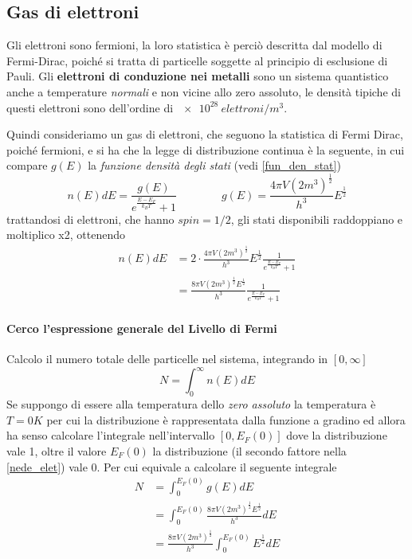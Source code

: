\subsection{Gas di elettroni}

Gli elettroni sono fermioni, la loro statistica è perciò descritta dal modello di Fermi-Dirac, poiché si tratta di particelle soggette al principio di esclusione di Pauli.
Gli \textbf{elettroni di conduzione nei metalli} sono un sistema quantistico anche a temperature \textit{normali} e non vicine allo zero assoluto, le densità tipiche di questi elettroni sono dell'ordine di $\SI{e28}{elettroni/m^3}$.

Quindi consideriamo un gas di elettroni, che seguono la statistica di Fermi Dirac, poiché fermioni, e si ha che la legge di distribuzione continua è la seguente, in cui compare $g(E)$ la \textit{funzione densità degli stati} (vedi \ref{fun_den_stat})
\begin{equation}
n(E)dE = \frac{ g(E)}{e^{ \frac{ E - E_F}{k_B T } } + 1 }
\quad\quad\quad\quad
g(E) = \frac{4 \pi V (2m^3)^{ \frac{1}{2} }}{h^3} E^{ \frac{1}{2} }
\end{equation}
trattandosi di elettroni, che hanno $spin=1/2$, gli stati disponibili raddoppiano e moltiplico x2, ottenendo
\begin{equation}
\begin{split}
n(E)dE & = 2 \cdot \frac{4 \pi V (2m^3)^{\frac{1}{2}} }{h^3} E^{\frac{1}{2}} \frac{1}{e^{\frac{E - E_F}{k_B T}} + 1} \\
& = \frac{8 \pi V (2m^3)^{\frac{1}{2}} E^{\frac{1}{2}}}{h^3} \frac{1}{e^{\frac{E - E_F}{k_B T}} + 1}
\label{nede_elet}
\end{split}
\end{equation}

\paragraph{Cerco l'espressione generale del Livello di Fermi}
Calcolo il numero totale delle particelle nel sistema, integrando in $[0, \infty]$
\begin{equation}
N = \int_0^{\infty} n(E)dE
\end{equation}
Se suppongo di essere alla temperatura dello \textit{zero assoluto} la temperatura è $T=0 K$ per cui la distribuzione è rappresentata dalla funzione a gradino ed allora ha senso calcolare l'integrale nell'intervallo $[0, E_F(0)]$ dove la distribuzione vale 1, oltre il valore $E_F(0)$ la distribuzione (il secondo fattore nella \ref{nede_elet}) vale 0.
Per cui equivale a calcolare il seguente integrale
\begin{equation}
\begin{split}
N & = \int_0^{E_F(0)} g(E)dE \\
& = \int_0^{E_F(0)} \frac{8 \pi V (2m^3)^{\frac{1}{2}} E^{\frac{1}{2}}}{h^3} dE \\
& = \frac{8 \pi V (2m^3)^{\frac{1}{2}}}{h^3} \int_0^{E_F(0)} E^{\frac{1}{2}} dE \\
\end{split}
\end{equation}






